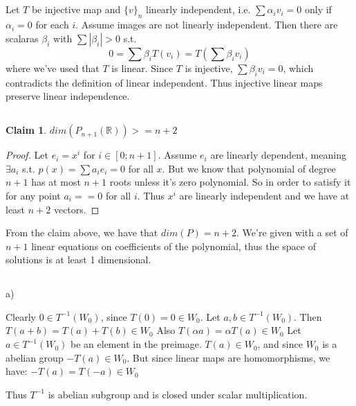 \documentclass{amsart}
\author{M. Tikhonov}
\def\R{\mathbb{R}}
\newtheorem{claim}{Claim}
\begin{document}
\subsection{}

Let $T$ be injective map and $\{ v \}_n$ linearly independent, i.e. $\sum \alpha_i v_i = 0$ only if $\alpha_i = 0$ for each $i$.
Assume images are not linearly independent. Then there are scalaras $\beta_i$ with $\sum |\beta_i| > 0$ s.t.
$$ 0 = \sum \beta_i T (v_i) = T(\sum \beta_i v_i)$$
where we've used that $T$ is linear. Since $T$ is injective, $\sum \beta_i v_i = 0$, which contradicts the definition of linear independent. Thus injective linear maps preserve linear independence.

\subsection{
}

\begin{claim}
    $dim (P_{n+1} (\R)) >= n+2$
\end{claim}

\begin{proof}
    Let $e_i = x^i$ for $i \in \left[0; n+1 \right] $. 
    Assume $e_i$ are linearly dependent, meaning $\exists a_i$ s.t. $p(x) = \sum a_i e_i = 0$ for all $x$. 
    But we know that polynomial of degree $n+1$ has at most $n+1$ roots unless it's zero polynomial. 
    So in order to satisfy it for any point $a_i == 0$ for all $i$.
    Thus $x^i$ are linearly independent and we have at least $n+2$ vectors.
\end{proof}
    From the claim above, we have that $dim (P) = n+2$.
    We're given with a set of $n+1$ linear equations on coefficients of the polynomial, thus the space of solutions is at least 1 dimensional. 

\subsection{
}
a) 

Clearly $0 \in T^{-1} (W_0)$, since $T(0) = 0 \in W_0$.
Let $a,b \in T^{-1} (W_0)$. Then $T(a+b) = T(a) + T(b) \in W_0$
Also $T(\alpha a) = \alpha T(a) \in W_0$
Let $a \in T^{-1}(W_0)$ be an element in the preimage. $T(a) \in W_0$, and since $W_0$ is a abelian group $-T(a) \in W_0$. But since linear maps are homomorphisms, we have:
$-T(a) = T(-a) \in W_0$

Thus $T^{-1}$ is abelian subgroup and is closed under scalar multiplication.
\end{document}
